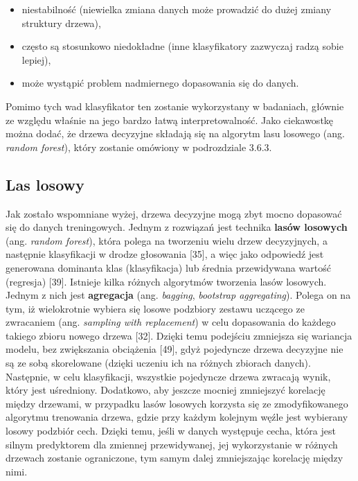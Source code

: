 \begin{itemize}
\item
niestabilność (niewielka zmiana danych może prowadzić do dużej zmiany struktury drzewa),

\item
często są stosunkowo niedokładne (inne klasyfikatory zazwyczaj radzą sobie lepiej),

\item
może wystąpić problem nadmiernego dopasowania się do danych.
\end{itemize}
\noindent Pomimo tych wad klasyfikator ten zostanie wykorzystany w badaniach, głównie ze względu właśnie na jego bardzo łatwą interpretowalność.
Jako ciekawostkę można dodać, że drzewa decyzyjne składają się na algorytm lasu losowego (ang. \textit{random forest}), który zostanie omówiony w podrozdziale 3.6.3. 

\subsection{Las losowy}
\label{cha:Las losowy}

Jak zostało wspomniane wyżej, drzewa decyzyjne mogą zbyt mocno dopasować się do danych treningowych. Jednym z rozwiązań jest technika \textbf{lasów losowych} (ang. \textit{random forest}), która polega na tworzeniu wielu drzew decyzyjnych, a następnie klasyfikacji w drodze głosowania [35], a więc jako odpowiedź jest generowana dominanta klas (klasyfikacja) lub średnia przewidywana wartość (regresja) [39]. Istnieje kilka różnych algorytmów tworzenia lasów losowych. Jednym z nich jest \textbf{agregacja} (ang. \textit{bagging}, \textit{bootstrap aggregating}). Polega on na tym, iż wielokrotnie wybiera się losowe podzbiory zestawu uczącego ze zwracaniem (ang. \textit{sampling with replacement}) w celu dopasowania do każdego takiego zbioru nowego drzewa [32]. Dzięki temu podejściu zmniejsza się wariancja modelu, bez zwiększania obciążenia [49], gdyż pojedyncze drzewa decyzyjne nie są ze sobą skorelowane (dzięki uczeniu ich na różnych zbiorach danych). Następnie, w celu klasyfikacji, wszystkie pojedyncze drzewa zwracają wynik, który jest uśredniony. Dodatkowo, aby jeszcze mocniej zmniejszyć korelację między drzewami, w przypadku lasów losowych korzysta się ze zmodyfikowanego algorytmu trenowania drzewa, gdzie przy każdym kolejnym węźle jest wybierany losowy podzbiór cech. Dzięki temu, jeśli w danych występuje cecha, która jest silnym predyktorem dla zmiennej przewidywanej, jej wykorzystanie w różnych drzewach zostanie ograniczone, tym samym dalej zmniejszając korelację między nimi.


